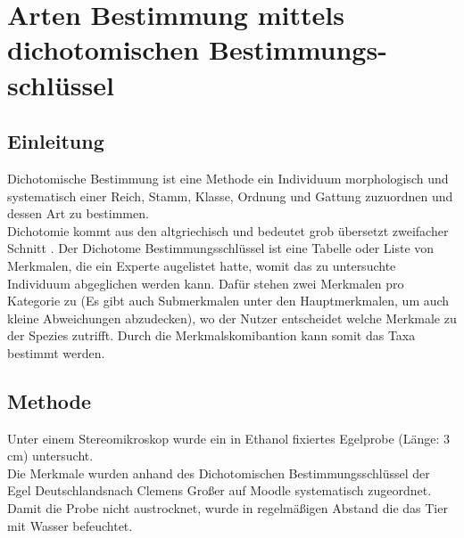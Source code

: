 \documentclass[oneside,10pt,a4paper]{report}
\begin{document}
	
	
		\section{Arten Bestimmung mittels dichotomischen Bestimmungs- schlüssel}\label{Abschnitt: DichoBestim}
			\subsection{Einleitung}
				Dichotomische Bestimmung ist eine Methode ein Individuum morphologisch und systematisch einer Reich, Stamm, Klasse, Ordnung und Gattung zuzuordnen und dessen Art zu bestimmen.\\
				Dichotomie kommt aus den altgriechisch und bedeutet grob übersetzt zweifacher Schnitt \cite{wiki_dichotom}.
				Der Dichotome Bestimmungsschlüssel ist eine Tabelle oder Liste von Merkmalen, die ein Experte augelistet hatte, womit das zu untersuchte Individuum abgeglichen werden kann. Dafür stehen zwei Merkmalen pro Kategorie zu (Es gibt auch Submerkmalen unter den Hauptmerkmalen, um auch kleine Abweichungen abzudecken), wo der Nutzer entscheidet welche Merkmale zu der Spezies zutrifft\cite{dichotomer_schlüssel}. Durch die Merkmalskomibantion kann somit das Taxa bestimmt werden.
			
			\subsection{Methode}
				Unter einem Stereomikroskop wurde ein in Ethanol fixiertes Egelprobe (Länge: 3 cm) untersucht.\\
				Die Merkmale wurden anhand des Dichotomischen Bestimmungsschlüssel der Egel Deutschlandsnach Clemens Großer auf Moodle systematisch zugeordnet.\\
				Damit die Probe nicht austrocknet, wurde in regelmäßigen Abstand die das Tier mit Wasser befeuchtet.
			
\end{document}
